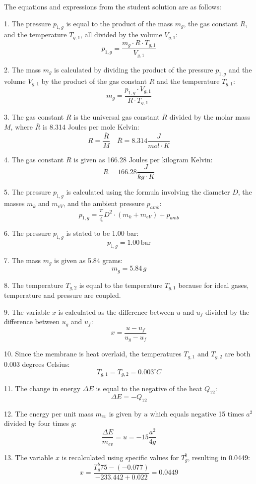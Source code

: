 The equations and expressions from the student solution are as follows:

1. The pressure \( p_{1,g} \) is equal to the product of the mass \( m_g \), the gas constant \( R \), and the temperature \( T_{g,1} \), all divided by the volume \( V_{g,1} \):
   \[
   p_{1,g} = \frac{m_g \cdot R \cdot T_{g,1}}{V_{g,1}}
   \]

2. The mass \( m_g \) is calculated by dividing the product of the pressure \( p_{1,g} \) and the volume \( V_{g,1} \) by the product of the gas constant \( R \) and the temperature \( T_{g,1} \):
   \[
   m_g = \frac{p_{1,g} \cdot V_{g,1}}{R \cdot T_{g,1}}
   \]

3. The gas constant \( R \) is the universal gas constant \( \overline{R} \) divided by the molar mass \( M \), where \( \overline{R} \) is 8.314 Joules per mole Kelvin:
   \[
   R = \frac{\overline{R}}{M} \quad \overline{R} = 8.314 \frac{J}{mol \cdot K}
   \]

4. The gas constant \( R \) is given as 166.28 Joules per kilogram Kelvin:
   \[
   R = 166.28 \frac{J}{kg \cdot K}
   \]

5. The pressure \( p_{1,g} \) is calculated using the formula involving the diameter \( D \), the masses \( m_k \) and \( m_{eV} \), and the ambient pressure \( p_{amb} \):
   \[
   p_{1,g} = \frac{\pi}{4} D^2 \cdot (m_k + m_{eV}) + p_{amb}
   \]

6. The pressure \( p_{1,g} \) is stated to be 1.00 bar:
   \[
   p_{1,g} = 1.00 \, \text{bar}
   \]

7. The mass \( m_g \) is given as 5.84 grams:
   \[
   m_g = 5.84 \, g
   \]

8. The temperature \( T_{g,2} \) is equal to the temperature \( T_{g,1} \) because for ideal gases, temperature and pressure are coupled.

9. The variable \( x \) is calculated as the difference between \( u \) and \( u_f \) divided by the difference between \( u_g \) and \( u_f \):
   \[
   x = \frac{u - u_f}{u_g - u_f}
   \]

10. Since the membrane is heat overlaid, the temperatures \( T_{g,1} \) and \( T_{g,2} \) are both 0.003 degrees Celsius:
    \[
    T_{g,1} = T_{g,2} = 0.003^\circ C
    \]

11. The change in energy \( \Delta E \) is equal to the negative of the heat \( Q_{12} \):
    \[
    \Delta E = -Q_{12}
    \]

12. The energy per unit mass \( m_{ev} \) is given by \( u \) which equals negative 15 times \( a^2 \) divided by four times \( g \):
    \[
    \frac{\Delta E}{m_{ev}} = u = -15 \frac{a^2}{4g}
    \]

13. The variable \( x \) is recalculated using specific values for \( T_{g}^b \), resulting in 0.0449:
    \[
    x = \frac{T_{g}^b 75 - (-0.077)}{-233.442 + 0.022} = 0.0449
    \]